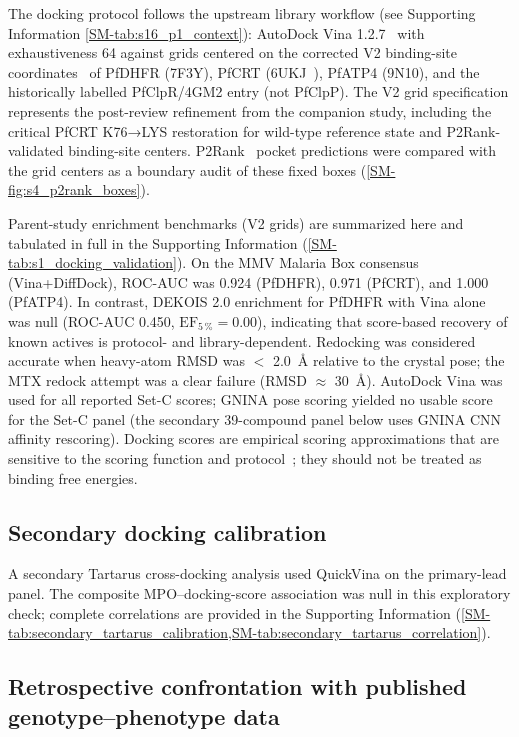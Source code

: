 \documentclass[11pt,a4paper]{article}
\begin{document}
The docking protocol follows the upstream library workflow (see Supporting Information \cref{SM-tab:s16_p1_context}): AutoDock Vina 1.2.7~\citep{vina_2021} with exhaustiveness \num{64} against grids centered on the corrected V2 binding-site coordinates~\citep{Temgoua2026} of PfDHFR (7F3Y), PfCRT (6UKJ~\citep{Kim2019PfCRT}), PfATP4 (9N10), and the historically labelled PfClpR/4GM2 entry (not PfClpP). The V2 grid specification represents the post-review refinement from the companion study, including the critical PfCRT K76→LYS restoration for wild-type reference state and P2Rank-validated binding-site centers. P2Rank~\citep{Krivak2018P2Rank} pocket predictions were compared with the grid centers as a boundary audit of these fixed boxes (\cref{SM-fig:s4_p2rank_boxes}).

Parent-study enrichment benchmarks (V2 grids) are summarized here and tabulated in full in the Supporting Information (\cref{SM-tab:s1_docking_validation}). On the MMV Malaria Box consensus (Vina+DiffDock), ROC-AUC was \num{0.924} (PfDHFR), \num{0.971} (PfCRT), and \num{1.000} (PfATP4). In contrast, DEKOIS 2.0 enrichment for PfDHFR with Vina alone was null (ROC-AUC \num{0.450}, $\mathrm{EF}_{5\,\%} = \num{0.00}$), indicating that score-based recovery of known actives is protocol- and library-dependent. Redocking was considered accurate when heavy-atom RMSD was $<$ \qty{2.0}{\angstrom} relative to the crystal pose; the MTX redock attempt was a clear failure (RMSD $\approx$ \qty{30}{\angstrom}). AutoDock Vina was used for all reported Set-C scores; GNINA pose scoring yielded no usable score for the Set-C panel (the secondary 39-compound panel below uses GNINA CNN affinity rescoring). Docking scores are empirical scoring approximations that are sensitive to the scoring function and protocol~\citep{ferreira2023docking,sadybekov2023computational,kittelson2026docking}; they should not be treated as binding free energies.

\subsection{Secondary docking calibration}

A secondary Tartarus cross-docking analysis used QuickVina on the primary-lead panel. The composite MPO--docking-score association was null in this exploratory check; complete correlations are provided in the Supporting Information (\cref{SM-tab:secondary_tartarus_calibration,SM-tab:secondary_tartarus_correlation}).

\subsection{Retrospective confrontation with published genotype--phenotype data}
\end{document}
